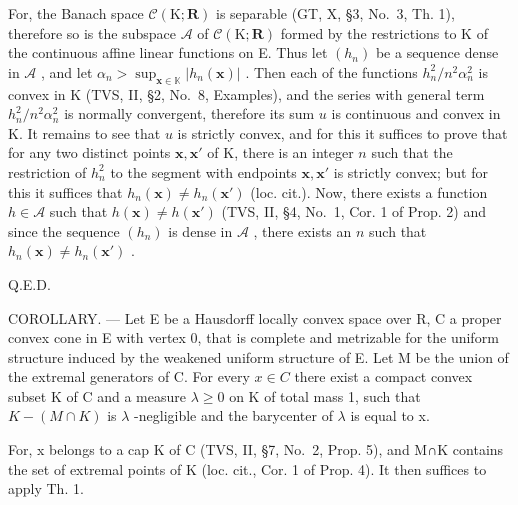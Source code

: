 For, the Banach space \(\mathcal{C}(\mathrm{K};\mathbf{R})\) is separable (GT, X, §3, No.~3, Th. 1), therefore so is the subspace \(\mathcal{A}\) of \(\mathcal{C}(\mathrm{K};\mathbf{R})\) formed by the restrictions to K of the continuous affine linear functions on E. Thus let \((h_n)\) be a sequence dense in \(\mathcal{A}\) , and let \(\alpha_{n} > \sup_{\mathbf{x}\in \mathbb{K}}|h_n(\mathbf{x})|\) . Then each of the functions \(h_n^2 / n^2\alpha_n^2\) is convex in K (TVS, II, §2, No.~8, Examples), and the series with general term \(h_n^2 / n^2\alpha_n^2\) is normally convergent, therefore its sum \(u\) is continuous and convex in K. It remains to see that \(u\) is strictly convex, and for this it suffices to prove that for any two distinct points \(\mathbf{x},\mathbf{x}'\) of K, there is an integer \(n\) such that the restriction of \(h_n^2\) to the segment with endpoints \(\mathbf{x},\mathbf{x}'\) is strictly convex; but for this it suffices that \(h_n(\mathbf{x})\neq h_n(\mathbf{x}')\) (loc. cit.). Now, there exists a function \(h\in \mathcal{A}\) such that \(h(\mathbf{x})\neq h(\mathbf{x}')\) (TVS, II, §4, No.~1, Cor. 1 of Prop. 2) and since the sequence \((h_n)\) is dense in \(\mathcal{A}\) , there exists an \(n\) such that \(h_n(\mathbf{x})\neq h_n(\mathbf{x}')\) .

Q.E.D.

COROLLARY. --- Let E be a Hausdorff locally convex space over R, C a proper convex cone in E with vertex 0, that is complete and metrizable for the uniform structure induced by the weakened uniform structure of E. Let M be the union of the extremal generators of C. For every \(x \in C\) there exist a compact convex subset K of C and a measure \(\lambda \geqslant 0\) on K of total mass 1, such that \(K - (M \cap K)\) is \(\lambda\) -negligible and the barycenter of \(\lambda\) is equal to x.

For, x belongs to a cap K of C (TVS, II, §7, No.~2, Prop. 5), and M∩K contains the set of extremal points of K (loc. cit., Cor. 1 of Prop. 4). It then suffices to apply Th. 1.

